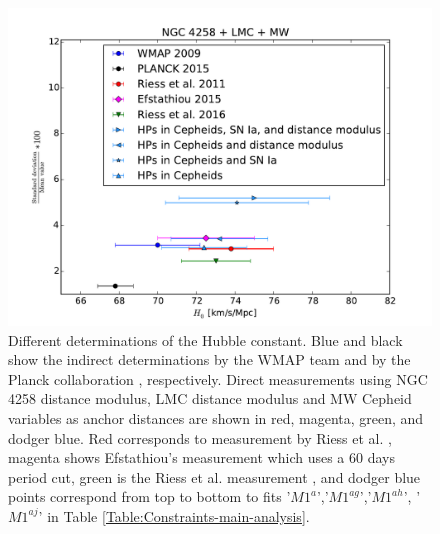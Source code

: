 \begin{figure}[hbtp]
\centering
\includegraphics[scale=.75]{figures/chapter-h0/H0_values_three_anchors.pdf}
\caption{Different determinations of the Hubble constant. Blue and black show the indirect determinations by the WMAP team \cite{Hinshaw:2012aka} and by the Planck collaboration \cite{Ade:2015xua}, respectively. Direct measurements using NGC 4258 distance modulus, LMC distance modulus and MW Cepheid variables as anchor distances are shown in red, magenta, green, and dodger blue. Red corresponds to measurement by Riess et al. \cite{Riess:2011yx}, magenta shows Efstathiou's measurement \cite{Efstathiou:2013via} which uses a $60$ days period cut, green is the Riess et al. measurement \cite{Riess:2016jrr}, and dodger blue points correspond from top to bottom to fits '$M1^a$','$M1^{ag}$','$M1^{ah}$', '$M1^{aj}$' in Table \ref{Table:Constraints-main-analysis}.\label{Fig:H0-values-3-anchors}}
\end{figure}

